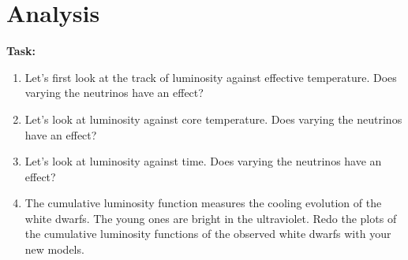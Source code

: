 \documentclass{article}
\begin{document}
\section{Analysis}

\textbf{Task:}\vspace{-1em}
\begin{enumerate}
 \setlength\itemsep{0em}
\item Let's first look at the track of luminosity against effective temperature.  Does varying the neutrinos have an effect?
\item Let's look at luminosity against core temperature.  Does varying the neutrinos have an effect?
\item Let's look at luminosity against time.  Does varying the neutrinos have an effect?
 \item 
 The cumulative luminosity function measures the cooling evolution of the white dwarfs.  The young ones are bright in the ultraviolet.  Redo the plots of the cumulative luminosity functions of the observed white dwarfs with your new models.
\end{enumerate}
\end{document}
